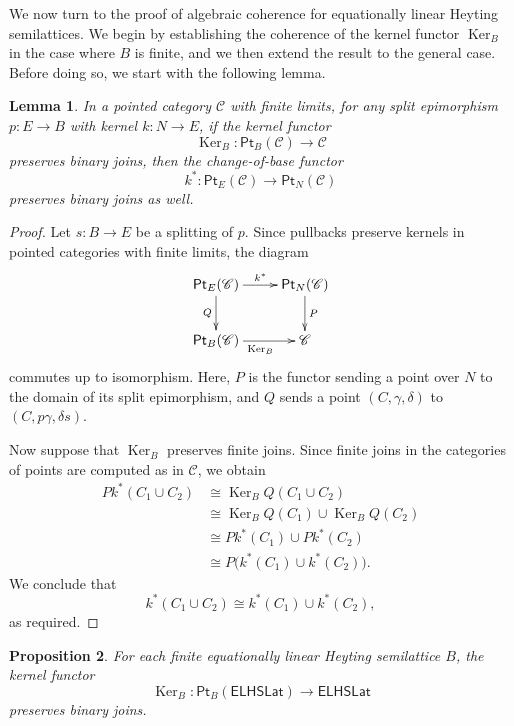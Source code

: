 \documentclass[reqno,a4paper]{amsart}
\newtheorem{lemma}{Lemma}[section]
\newtheorem{proposition}[lemma]{Proposition}
\theoremstyle{remark}
\theoremstyle{definition}
\newcommand{\ojoin}{\cup}  %
\DeclareMathOperator{\Ker}{Ker}
\newcommand{\ELHSLat}{\ensuremath{\mathsf{ELHSLat}}}
\newcommand{\C}{\ensuremath{\mathcal{C}}}
\newcommand{\Pt}{\ensuremath{\mathsf{Pt}}}
\begin{document}
We now turn to the proof of algebraic coherence for equationally linear Heyting semilattices.
We begin by establishing the coherence of the kernel functor \(\Ker_B\) in the case where \(B\) is finite, and we then extend the result to the general case.
Before doing so, we start with the following lemma.


\begin{lemma}\label{lemma on coherence}
	In a pointed category \(\C\) with finite limits, for any split epimorphism
	\(p\colon E \to B\) with kernel \(k\colon N \to E\), if the kernel functor
	\[
		\Ker_B \colon \Pt_B(\C) \to \C
	\]
	preserves binary joins, then the change-of-base functor
	\[
		k^* \colon \Pt_E(\C) \to \Pt_N(\C)
	\]
	preserves binary joins as well.
\end{lemma}

\begin{proof}
	Let \(s\colon B \to E\) be a splitting of \(p\).
	Since pullbacks preserve kernels in pointed categories with finite limits, the diagram
	\[
		\xymatrix{
			\Pt_E(\C) \ar[r]^{k^*} \ar[d]_{Q} &
			\Pt_N(\C) \ar[d]^{P} \\
			\Pt_B(\C) \ar[r]_{\Ker_B} &
			\C
		}
	\]
	commutes up to isomorphism. Here, \(P\) is the functor sending a point over \(N\) to the domain of its split epimorphism, and \(Q\) sends a point \((C,\gamma,\delta)\) to \((C,p\gamma,\delta s)\).

	Now suppose that \(\Ker_B\) preserves finite joins. Since finite joins in the categories of points are computed as in \(\C\), we obtain
	\begin{align*}
		P k^*(C_1 \ojoin C_2)
		 & \cong \Ker_B Q(C_1 \ojoin C_2)               \\
		 & \cong \Ker_B Q(C_1) \ojoin \Ker_B Q(C_2)     \\
		 & \cong P k^*(C_1) \ojoin P k^*(C_2)           \\
		 & \cong P\bigl(k^*(C_1) \ojoin k^*(C_2)\bigr).
	\end{align*}
	We conclude that
	\[
		k^*(C_1 \ojoin C_2) \cong k^*(C_1) \ojoin k^*(C_2),
	\]
	as required.
\end{proof}


\begin{proposition}\label{proposition ac for finite}
	For each finite equationally linear Heyting semilattice \(B\), the kernel functor
	\[
		\Ker_B \colon \Pt_B(\ELHSLat) \longrightarrow \ELHSLat
	\]
	preserves binary joins.
\end{proposition}
\end{document}
